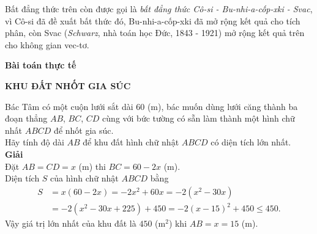 Bất đẳng thức trên còn được gọi là \textit{bất đẳng thức Cô-si - Bu-nhi-a-cốp-xki - Svac}, vì Cô-si đã đề xuất bất thức đó, Bu-nhi-a-cốp-xki đã mở rộng kết quả cho tích phân, còn Svac (\textit{Schwarz}, nhà toán học Đức, 1843 - 1921) mở rộng kết quả trên cho không gian vec-tơ.\medskip

\noindent \textbf{Bài toán thực tế}
\begin{center}
	\textbf{KHU ĐẤT NHỐT GIA SÚC}
\end{center}
Bác Tâm có một cuộn lưới sắt dài $60$ (m), bác muốn dùng lưới căng thành ba đoạn thẳng $AB$, $BC$, $CD$ cùng với bức tường có sẵn làm thành một hình chữ nhất $ABCD$ để nhốt gia súc.\\
Hãy tính độ dài $AB$ để khu đất hình chữ nhật $ABCD$ có diện tích lớn nhất.\\
\textbf{Giải}\\
Đặt $AB=CD=x$ (m) thi $BC=60-2x$ (m).\\
Diện tích $S$ của hình chữ nhật $ABCD$ bằng 
\begin{align*}
S&=x(60-2x)=-2x^2+60x=-2(x^2-30x)\\
&=-2(x^2-30x+225)+450=-2(x-15)^2+450\leq450.
\end{align*}
Vậy giá trị lớn nhất của khu đất là $450$ (m$^2$) khi $AB=x=15$ (m).
